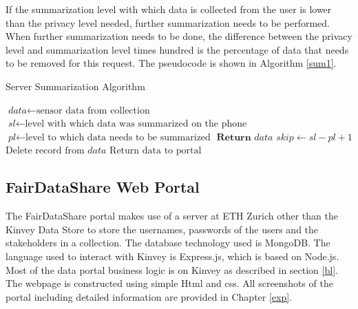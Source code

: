 If the summarization level with which data is collected from the user is lower than the privacy level needed, further summarization needs to be performed. When further summarization needs to be done, the difference between the privacy level and summarization level times hundred is the percentage of data that needs to be removed for this request. The pseudocode is shown in Algorithm \ref{sum1}.

\begin{algorithm}
\caption{Server Summarization Algorithm}\label{sum1}
\begin{algorithmic}[1]
\State $\textit{data} \gets \text{sensor data from collection}$
\State $\textit{sl} \gets \text{level with which data was summarized on the phone}$
\State $\textit{pl} \gets \text{level to which data needs to be summarized}$
	\State $\textbf{Return }\textit{data}$
\Else
	\State $\textit{skip} \gets \textit{sl}-\textit{pl}+1$
 	 \State $\text{Delete record from}\textit{ data}$
 	 \EndFor
\EndIf
\State $\text{Return data to portal}$
\EndProcedure
\end{algorithmic}
\end{algorithm}

\subsection{FairDataShare Web Portal}
The FairDataShare portal makes use of a server at ETH Zurich other than the Kinvey Data Store to store the usernames, passwords of the users and the stakeholders in a collection. The database technology used is MongoDB. The language used to interact with Kinvey is Express.js, which is based on Node.js. Most of the data portal business logic is on Kinvey as described in section \ref{bl}. The webpage is constructed using simple Html and css. All screenshots of the portal including detailed information are provided in Chapter \ref{exp}.









